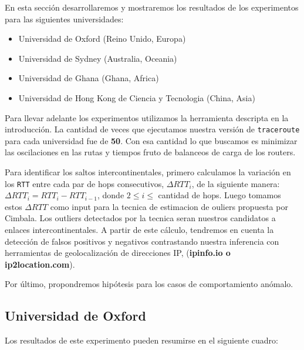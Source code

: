 En esta sección desarrollaremos y mostraremos los resultados de los experimentos para las siguientes
universidades:

\begin{itemize}
\item Universidad de Oxford (Reino Unido, Europa)
\item Universidad de Sydney (Australia, Oceania)
\item Universidad de Ghana (Ghana, Africa)
\item Universidad de Hong Kong de Ciencia y Tecnologia (China, Asia)
\end{itemize}

Para llevar adelante los experimentos utilizamos la herramienta descripta en la introducción. La cantidad de veces que ejecutamos nuestra versión de \texttt{traceroute} para cada universidad fue de \textbf{50}. Con esa cantidad lo que buscamos  es minimizar las oscilaciones en las rutas y tiempos fruto de balanceos de carga de los routers.

Para identificar los saltos intercontinentales, primero calculamos la variación en los \texttt{RTT} entre cada par de hops consecutivos, $\Delta RTT_{i}$, de la siguiente manera: \(\Delta RTT_{i} = RTT_{i} - RTT_{i-1}\), donde $2 \leq i \leq$ cantidad de hops. Luego tomamos estos $\Delta RTT$ como input para la tecnica de estimacion de ouliers propuesta por Cimbala\cite{Cimbala}. Los outliers detectados por la tecnica seran nuestros candidatos a enlaces intercontinentales.
A partir de este cálculo, tendremos en cuenta la detección de falsos positivos y negativos contrastando nuestra inferencia con herramientas de geolocalización de direcciones IP, (\textbf{ipinfo.io o ip2location.com}).

Por último, propondremos hipótesis para los casos de comportamiento anómalo.

\subsection{Universidad de Oxford}

Los resultados de este experimento pueden resumirse en el siguiente cuadro:

